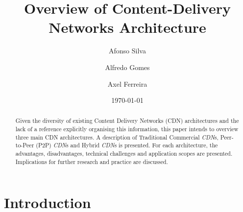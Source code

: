 \documentclass{llncs}
\begin{document}
\mainmatter
\title{Overview of Content-Delivery Networks Architecture}


\author{Afonso Silva\and Alfredo Gomes \and Axel Ferreira}



\date{\today}


\maketitle




\begin{abstract}
Given the diversity of existing Content Delivery Networks (CDN) architectures and the lack of a reference explicitly organising this information, this paper intends to overview three main CDN architectures. A description of Traditional Commercial \textit{CDN}s, Peer-to-Peer (P2P) \textit{CDN}s and Hybrid \textit{CDN}s is presented. For each architecture, the advantages, disadvantages, technical challenges and application scopes are presented.
Implications for further research and practice are discussed.
\end{abstract}



\section{Introduction}									%
\end{document}
